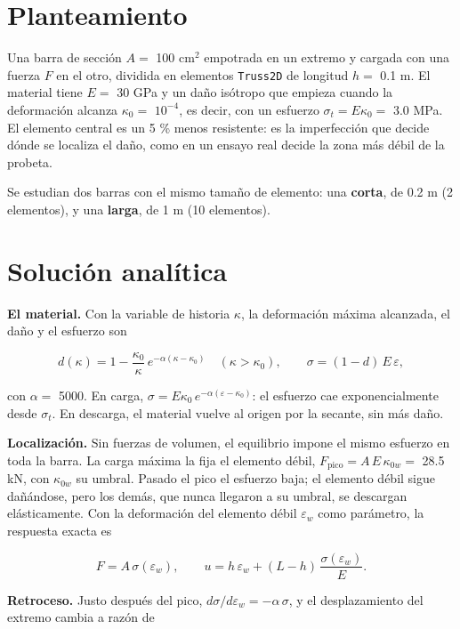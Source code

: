 \documentclass[11pt,oneside]{report}
\begin{document}
\section{Planteamiento}

Una barra de sección $A =$ 100 cm\ensuremath{^{2}} empotrada en un extremo y cargada con una fuerza $F$ en el otro, dividida en elementos \texttt{Truss2D} de longitud $h =$ 0.1 m. El material tiene $E =$ 30 GPa y un daño isótropo que empieza cuando la deformación alcanza $\kappa_0 =$ $10^{-4}$, es decir, con un esfuerzo $\sigma_t = E\kappa_0 =$ 3.0 MPa. El elemento central es un 5 \% menos resistente: es la imperfección que decide dónde se localiza el daño, como en un ensayo real decide la zona más débil de la probeta.

Se estudian dos barras con el mismo tamaño de elemento: una \textbf{corta}, de 0.2 m (2 elementos), y una \textbf{larga}, de 1 m (10 elementos).

\section{Solución analítica}

\textbf{El material.} Con la variable de historia $\kappa$, la deformación máxima alcanzada, el daño y el esfuerzo son

\[
d(\kappa) = 1 - \frac{\kappa_0}{\kappa}\,e^{-\alpha(\kappa - \kappa_0)} \quad (\kappa > \kappa_0),
\qquad
\sigma = (1 - d)\,E\,\varepsilon ,
\]

con $\alpha =$ 5000. En carga, $\sigma = E\kappa_0\,e^{-\alpha(\varepsilon - \kappa_0)}$: el esfuerzo cae exponencialmente desde $\sigma_t$. En descarga, el material vuelve al origen por la secante, sin más daño.

\textbf{Localización.} Sin fuerzas de volumen, el equilibrio impone el mismo esfuerzo en toda la barra. La carga máxima la fija el elemento débil, $F_{\mathrm{pico}} = A\,E\,\kappa_{0w} =$ 28.5 kN, con $\kappa_{0w}$ su umbral. Pasado el pico el esfuerzo baja; el elemento débil sigue dañándose, pero los demás, que nunca llegaron a su umbral, se descargan elásticamente. Con la deformación del elemento débil $\varepsilon_w$ como parámetro, la respuesta exacta es

\[
F = A\,\sigma(\varepsilon_w),
\qquad
u = h\,\varepsilon_w + (L - h)\,\frac{\sigma(\varepsilon_w)}{E} .
\]

\textbf{Retroceso.} Justo después del pico, $d\sigma/d\varepsilon_w = -\alpha\,\sigma$, y el desplazamiento del extremo cambia a razón de
\end{document}
